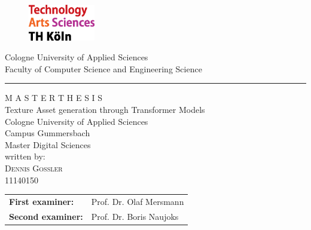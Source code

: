 \documentclass[a4paper,12pt,oneside]{article}
\begin{document}
    

    \pagestyle{empty}
    \begin{titlepage}
    \begin{figure}[!ht]
            \includegraphics[width=0.26\textwidth]{sources/logo_TH-Koeln_CMYK_22pt.eps}
    \end{figure}

    \begin{center}
      \Large
      Cologne University of Applied Sciences\\
      Faculty of Computer Science and Engineering Science\\
      \vspace{0.5cm}
      \hrule\par\rule{0pt}{2cm}
      \LARGE
      \textsc{M A S T E R  T H E S I S}\\
      \vspace{1cm}
      \huge
      Texture Asset generation through Transformer Models\\
      \vspace{1.5cm}
      \large
      Cologne University of Applied Sciences\\
      Campus Gummersbach\\
      Master Digital Sciences\\ 
      \vspace{1.0cm}
      written by:\\
      \textsc{Dennis Goßler}\\
      11140150\\
      \vspace{1.5cm}
      \begin{tabular}{ll}
          \textbf{First examiner:} & Prof. Dr. Olaf Mersmann \\
          \textbf{Second examiner:} & Prof. Dr. Boris Naujoks \\
      \end{tabular}
    
    \end{center}    
    \end{titlepage}
    
    \newpage
    
    
    \begin{abstract}
    
    \end{abstract}
    
\end{document}
